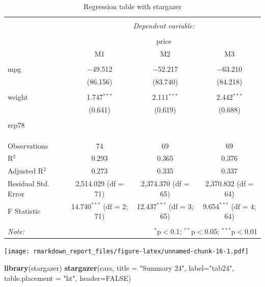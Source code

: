 \documentclass[
  12pt,
]{article}
\newenvironment{Shaded}{\begin{snugshade}}{\end{snugshade}}
\newcommand{\DataTypeTok}[1]{\textcolor[rgb]{0.13,0.29,0.53}{#1}}
\newcommand{\KeywordTok}[1]{\textcolor[rgb]{0.13,0.29,0.53}{\textbf{#1}}}
\newcommand{\NormalTok}[1]{#1}
\newcommand{\OtherTok}[1]{\textcolor[rgb]{0.56,0.35,0.01}{#1}}
\newcommand{\StringTok}[1]{\textcolor[rgb]{0.31,0.60,0.02}{#1}}
\begin{document}
\begin{table}[ht] \centering 
  \caption{Regression table with stargazer} 
  \label{tab3} 
\begin{tabular}{@{\extracolsep{5pt}}lccc} 
\\[-1.8ex]\hline 
\hline \\[-1.8ex] 
 & \multicolumn{3}{c}{\textit{Dependent variable:}} \\ 
\cline{2-4} 
\\[-1.8ex] & \multicolumn{3}{c}{price} \\ 
 & M1 & M2 & M3 \\ 
\hline \\[-1.8ex] 
 mpg & $-$49.512 & $-$52.217 & $-$63.210 \\ 
  & (86.156) & (83.740) & (84.218) \\ 
  & & & \\ 
 weight & 1.747$^{***}$ & 2.111$^{***}$ & 2.442$^{***}$ \\ 
  & (0.641) & (0.619) & (0.688) \\ 
  & & & \\ 
 rep78 &  &  &  \\ 
  &  &  &  \\ 
  & & & \\ 
\hline \\[-1.8ex] 
Observations & 74 & 69 & 69 \\ 
R$^{2}$ & 0.293 & 0.365 & 0.376 \\ 
Adjusted R$^{2}$ & 0.273 & 0.335 & 0.337 \\ 
Residual Std. Error & 2,514.029 (df = 71) & 2,374.370 (df = 65) & 2,370.832 (df = 64) \\ 
F Statistic & 14.740$^{***}$ (df = 2; 71) & 12.437$^{***}$ (df = 3; 65) & 9.654$^{***}$ (df = 4; 64) \\ 
\hline 
\hline \\[-1.8ex] 
\textit{Note:}  & \multicolumn{3}{r}{$^{*}$p$<$0.1; $^{**}$p$<$0.05; $^{***}$p$<$0.01} \\ 
\end{tabular} 
\end{table}

\texttt{[image: rmarkdown\_report\_files/figure-latex/unnamed-chunk-16-1.pdf]}

\begin{Shaded}
\begin{Highlighting}[]
\KeywordTok{library}\NormalTok{(stargazer)}
\KeywordTok{stargazer}\NormalTok{(cars,}
          \DataTypeTok{title =} \StringTok{"Summary 24"}\NormalTok{,}
          \DataTypeTok{label=}\StringTok{"tab24"}\NormalTok{,}
          \DataTypeTok{table.placement =} \StringTok{"ht"}\NormalTok{,}
          \DataTypeTok{header=}\OtherTok{FALSE}\NormalTok{)}
\end{Highlighting}
\end{Shaded}
\end{document}
